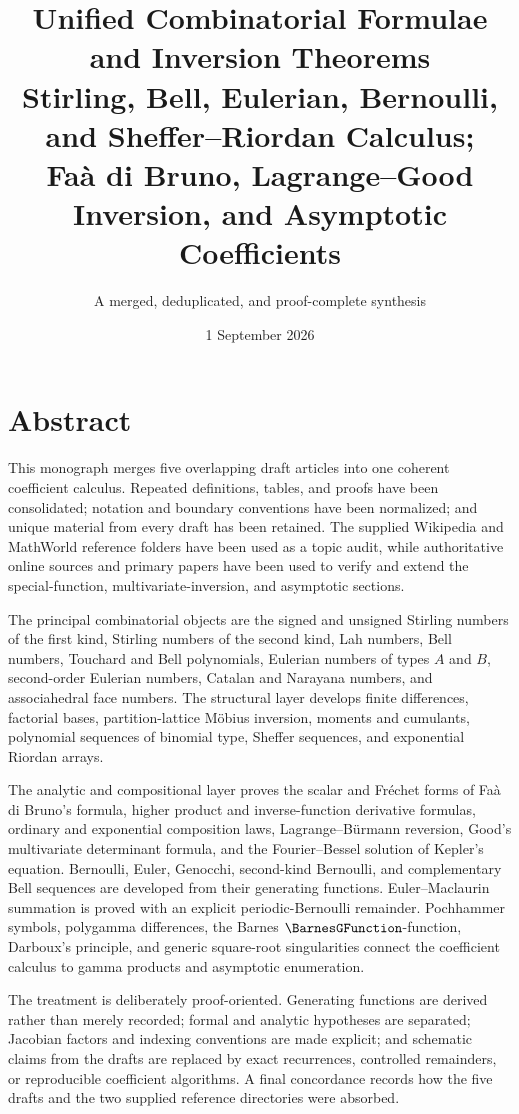 \documentclass[11pt,a4paper,oneside,openany]{book}
\title{\Huge\bfseries Unified Combinatorial Formulae\\[1mm]
and Inversion Theorems\\[4mm]
\Large Stirling, Bell, Eulerian, Bernoulli, and Sheffer--Riordan Calculus;\\
Fa\`a di Bruno, Lagrange--Good Inversion, and Asymptotic Coefficients}
\author{A merged, deduplicated, and proof-complete synthesis}
\date{1 September 2026}
\theoremstyle{definition}
\theoremstyle{remark}
\begin{document}
\frontmatter
\hypersetup{pageanchor=false}
\maketitle
\hypersetup{pageanchor=true}

\chapter*{Abstract}
This monograph merges five overlapping draft articles into one coherent coefficient
calculus.  Repeated definitions, tables, and proofs have been consolidated; notation
and boundary conventions have been normalized; and unique material from every draft
has been retained.  The supplied Wikipedia and MathWorld reference folders have been
used as a topic audit, while authoritative online sources and primary papers have
been used to verify and extend the special-function, multivariate-inversion, and
asymptotic sections.

The principal combinatorial objects are the signed and unsigned Stirling numbers of
the first kind, Stirling numbers of the second kind, Lah numbers, Bell numbers,
Touchard and Bell polynomials, Eulerian numbers of types $A$ and $B$, second-order
Eulerian numbers, Catalan and Narayana numbers, and associahedral face numbers.  The
structural layer develops finite differences, factorial bases, partition-lattice
M\"obius inversion, moments and cumulants, polynomial sequences of binomial type,
Sheffer sequences, and exponential Riordan arrays.

The analytic and compositional layer proves the scalar and Fr\'echet forms of Fa\`a
di Bruno's formula, higher product and inverse-function derivative formulas,
ordinary and exponential composition laws, Lagrange--B\"urmann reversion, Good's
multivariate determinant formula, and the Fourier--Bessel solution of Kepler's
equation.  Bernoulli, Euler, Genocchi, second-kind Bernoulli, and complementary Bell
sequences are developed from their generating functions.  Euler--Maclaurin
summation is proved with an explicit periodic-Bernoulli remainder.  Pochhammer
symbols, polygamma differences, the Barnes $\BarnesGFunction$-function, Darboux's principle, and
generic square-root singularities connect the coefficient calculus to gamma
products and asymptotic enumeration.

The treatment is deliberately proof-oriented.  Generating functions are derived
rather than merely recorded; formal and analytic hypotheses are separated;
Jacobian factors and indexing conventions are made explicit; and schematic claims
from the drafts are replaced by exact recurrences, controlled remainders, or
reproducible coefficient algorithms.  A final concordance records how the five
drafts and the two supplied reference directories were absorbed.
\end{document}
